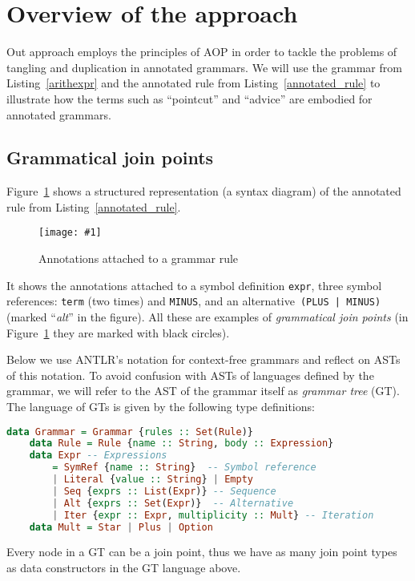 \documentclass{IOS-Book-Article}     %
\newcommand{\fig}[2]{%
\begin{figure}%
\centering%
\texttt{[image: \#1]}%
\caption{#2}\label{#1}%
\end{figure}%
}
\newcommand{\lstref}[1]{Listing~\ref{#1}}
\newcommand{\figref}[1]{Figure~\ref{#1}}
\newcommand{\tool}[1]{\textsc{#1}}
\begin{document}
\section{Overview of the approach}\label{Approach}

Out approach employs the principles of AOP in order to tackle the problems of tangling and duplication in annotated grammars. We will use the grammar from \lstref{arithexpr} and the annotated rule from \lstref{annotated_rule} to illustrate how the terms such as ``pointcut'' and ``advice'' are embodied for annotated grammars. 

\subsection{Grammatical join points}
\figref{structured} shows a structured representation (a syntax diagram) of the annotated rule from \lstref{annotated_rule}. 
\fig{structured}{Annotations attached to a grammar rule}
It shows the annotations attached to a symbol definition \texttt{expr}, three symbol references: \texttt{term} (two times) and \texttt{MINUS}, and an alternative~\mbox{\texttt{(PLUS | MINUS)}} (marked ``\emph{alt}'' in the figure). All these are examples of \emph{grammatical join points} (in \figref{structured} they are marked with black circles). 

Below we use \tool{ANTLR}'s notation for context-free grammars and reflect on ASTs of this notation. To avoid confusion with ASTs of languages defined by the grammar, we will refer to the AST of the grammar itself as \emph{grammar tree} (GT). The language of GTs is given by the following type definitions:
\begin{lstlisting}[language=Haskell]
	data Grammar = Grammar {rules :: Set(Rule)}
	data Rule = Rule {name :: String, body :: Expression}
	data Expr -- Expressions
		= SymRef {name :: String}  -- Symbol reference
		| Literal {value :: String} | Empty
		| Seq {exprs :: List(Expr)} -- Sequence
		| Alt {exprs :: Set(Expr)}  -- Alternative
		| Iter {expr :: Expr, multiplicity :: Mult} -- Iteration
	data Mult = Star | Plus | Option
\end{lstlisting}
Every node in a GT can be a join point, thus we have as many join point types as data constructors in the GT language above.
\end{document}
